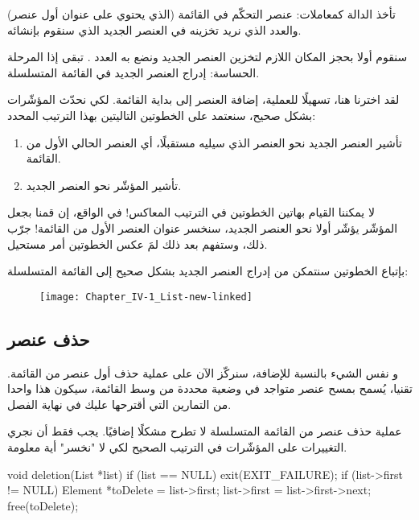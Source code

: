 تأخذ الدالة
كمعاملات: عنصر التحكّم في القائمة (الذي يحتوي على عنوان أول عنصر) والعدد الذي نريد تخزينه في العنصر الجديد الذي سنقوم بإنشائه. 

سنقوم أولا بحجز المكان اللازم لتخزين العنصر الجديد ونضع به العدد
.
تبقى إذا المرحلة الحساسة: إدراج العنصر الجديد في القائمة المتسلسلة.

لقد اخترنا هنا، تسهيلًا للعملية، إضافة العنصر إلى بداية القائمة. لكي نحدّث المؤشّرات بشكل صحيح، سنعتمد على الخطوتين التاليتين بهذا الترتيب المحدد:

\begin{enumerate}
	\item تأشير العنصر الجديد نحو العنصر الذي سيليه مستقبلًا، أي العنصر الحالي الأول من القائمة.
	\item تأشير المؤشّر
	نحو العنصر الجديد.
\end{enumerate}

\begin{warning}
لا يمكننا القيام بهاتين الخطوتين في الترتيب المعاكس! في الواقع، إن قمنا بجعل المؤشّر
يؤشّر أولا نحو العنصر الجديد، سنخسر عنوان العنصر الأول من القائمة! جرّب ذلك، وستفهم بعد ذلك لمَ عكس الخطوتين أمر مستحيل.
\end{warning}

بإتباع الخطوتين سنتمكن من إدراج العنصر الجديد بشكل صحيح إلى القائمة المتسلسلة:

\begin{figure}[H]
	\centering
	\texttt{[image: Chapter\_IV-1\_List-new-linked]}
\end{figure}

\subsection{حذف عنصر}

و نفس الشيء بالنسبة للإضافة، سنركّز الآن على عملية حذف أول عنصر من القائمة. تقنيا، يُسمح بمسح عنصر متواجد في وضعية محددة من وسط القائمة، سيكون هذا واحدا من التمارين التي أقترحها عليك في نهاية الفصل.

عملية حذف عنصر من القائمة المتسلسلة لا تطرح مشكلًا إضافيًا. يجب فقط أن نجري التغييرات على المؤشّرات في الترتيب الصحيح لكي لا "نخسر" أية معلومة.

\begin{Csource}
void deletion(List *list)
{
	if (list == NULL)
	{
		exit(EXIT_FAILURE);
	}
	if (list->first != NULL)
	{
		Element *toDelete = list->first;
		list->first = list->first->next;
		free(toDelete);
	}
}
\end{Csource}

